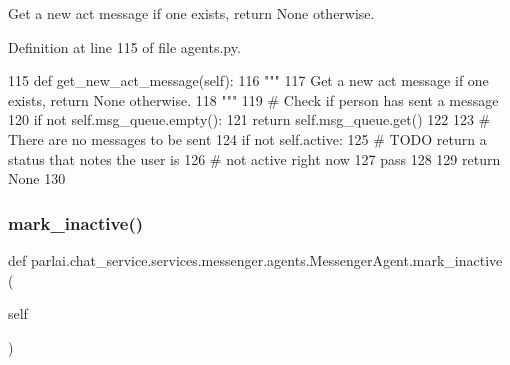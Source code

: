 \begin{DoxyVerb}Get a new act message if one exists, return None otherwise.
\end{DoxyVerb}
 

Definition at line 115 of file agents.\+py.


\begin{DoxyCode}
115     \textcolor{keyword}{def }get\_new\_act\_message(self):
116         \textcolor{stringliteral}{"""}
117 \textcolor{stringliteral}{        Get a new act message if one exists, return None otherwise.}
118 \textcolor{stringliteral}{        """}
119         \textcolor{comment}{# Check if person has sent a message}
120         \textcolor{keywordflow}{if} \textcolor{keywordflow}{not} self.msg\_queue.empty():
121             \textcolor{keywordflow}{return} self.msg\_queue.get()
122 
123         \textcolor{comment}{# There are no messages to be sent}
124         \textcolor{keywordflow}{if} \textcolor{keywordflow}{not} self.active:
125             \textcolor{comment}{# TODO return a status that notes the user is}
126             \textcolor{comment}{# not active right now}
127             \textcolor{keywordflow}{pass}
128 
129         \textcolor{keywordflow}{return} \textcolor{keywordtype}{None}
130 
\end{DoxyCode}
\mbox{\label{classparlai_1_1chat__service_1_1services_1_1messenger_1_1agents_1_1MessengerAgent_a54599a1e6c1f72fb4d18775752de3884}} 
\subsubsection{\texorpdfstring{mark\+\_\+inactive()}{mark\_inactive()}}
{\footnotesize\ttfamily def parlai.\+chat\+\_\+service.\+services.\+messenger.\+agents.\+Messenger\+Agent.\+mark\+\_\+inactive (\begin{DoxyParamCaption}\item[{}]{self }\end{DoxyParamCaption})}



